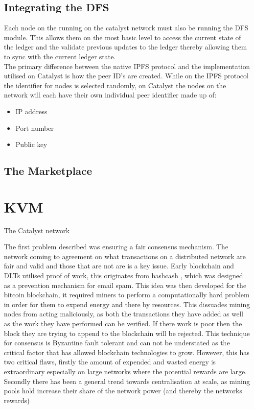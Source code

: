 \documentclass{article}
\begin{document}
\subsection{Integrating the DFS}

Each node on the running on the catalyst network must also be running the DFS module. This allows them on the most basic level to access the current state of the ledger and the validate previous updates to the ledger thereby allowing them to sync with the current ledger state. \\

The primary difference between the native IPFS protocol and the implementation utilised on Catalyst is how the peer ID's are created.  While on the IPFS protocol the identifier for nodes is selected randomly, on Catalyst the nodes on the network will each have their own individual peer identifier\cite{BytesExtentions} made up of:

\begin{itemize}
\item IP address
\item Port number
\item Public key
\end{itemize}



\subsection{The Marketplace}

\section{KVM}

The Catalyst network \cite{KVM}

The first problem described was ensuring a fair consensus mechanism. The network coming to agreement on what transactions on a distributed network are fair and valid and those that are not are is a key issue. Early blockchain and DLTs utilised proof of work, this originates from hashcash \cite{back2002hashcash}, which was designed as a prevention mechanism for email spam. This idea was then developed for the bitcoin blockchain, it required miners to perform a computationally hard problem in order for them to expend energy and there by resources. This dissuades mining nodes from acting maliciously, as both the transactions they have added as well as the work they have performed can be verified. If there work is poor then the block they are trying to append to the blockchain will be rejected. This technique for consensus is Byzantine fault tolerant and can not be understated as the critical factor that has allowed blockchain technologies to grow. However, this has two critical flaws, firstly the amount of expended and wasted energy is extraordinary especially on large networks where the potential rewards are large. Secondly there has been a general trend towards centralisation at scale, as mining pools hold increase their share of the network power (and thereby the networks rewards) \\
\end{document}
